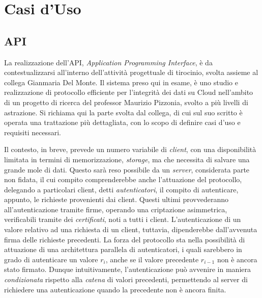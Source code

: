 \section{Casi d'Uso}


	\subsection{API}

	La realizzazione dell'API, \textit{Application Programming Interface}, è da contestualizzarsi all'interno dell'attività progettuale di tirocinio, svolta assieme al collega Gianmaria Del Monte. Il sistema preso qui in esame, è uno studio e realizzazione di protocollo efficiente per l'integrità dei dati su Cloud nell'ambito di un progetto di ricerca \cite{main_project} del professor Maurizio Pizzonia, svolto a più livelli di astrazione. Si richiama qui la parte svolta dal collega, di cui sul suo scritto \cite{pipelineintegrity_thesis} è operata una trattazione più dettagliata, con lo scopo di definire casi d'uso e requisiti necessari.
	
	Il contesto, in breve, prevede un numero variabile di \textit{client}, con una disponibilità limitata in termini di memorizzazione, \textit{storage}, ma che necessita di salvare una grande mole di dati. Questo sarà reso possibile da un \textit{server}, considerata parte non fidata, il cui compito comprenderebbe anche l'attuazione del protocollo, delegando a particolari client, detti \textit{autenticatori}, il compito di autenticare, appunto, le richieste provenienti dai client. Questi ultimi provvederanno all'autenticazione tramite firme, operando una criptazione asimmetrica, verificabili tramite dei \textit{certificati}, noti a tutti i client. L'autenticazione di un valore relativo ad una richiesta di un client, tuttavia, dipenderebbe dall'avvenuta firma delle richieste precedenti.
	La forza del protocollo sta nella possibilità di attuazione di una architettura parallela di autenticatori, i quali sarebbero in grado di autenticare un valore $ r_{i} $, anche se il valore precedente $ r_{i-1} $ non è ancora stato firmato. Dunque intuitivamente, l'autenticazione può avvenire in maniera \textit{condizionata} rispetto alla \textit{catena} di valori precedenti, permettendo al server di richiedere una autenticazione quando la precedente non è ancora finita.
	
